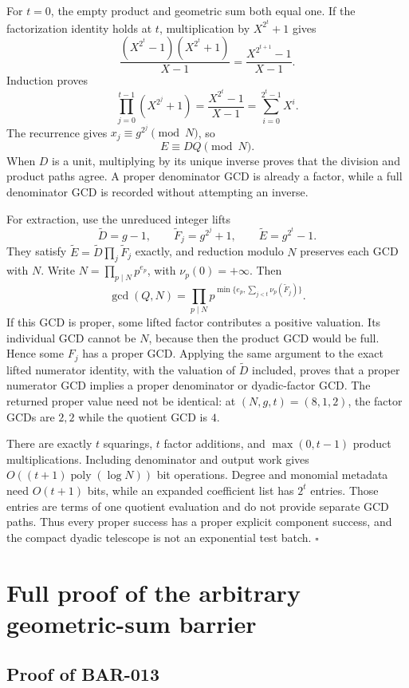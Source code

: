 \documentclass[11pt]{article}
\newcommand{\poly}{\operatorname{poly}}
\begin{document}
For \(t=0\), the empty product and geometric sum both equal one. If the
factorization identity holds at \(t\), multiplication by
\(X^{2^t}+1\) gives
\[
\frac{(X^{2^t}-1)(X^{2^t}+1)}{X-1}
=\frac{X^{2^{t+1}}-1}{X-1}.
\]
Induction proves
\[
\prod_{j=0}^{t-1}(X^{2^j}+1)
=\frac{X^{2^t}-1}{X-1}
=\sum_{i=0}^{2^t-1}X^i.
\]
The recurrence gives \(x_j\equiv g^{2^j}\pmod N\), so
\[
E\equiv DQ\pmod N.
\]
When \(D\) is a unit, multiplying by its unique inverse proves that the
division and product paths agree. A proper denominator GCD is already a
factor, while a full denominator GCD is recorded without attempting an
inverse.

For extraction, use the unreduced integer lifts
\[
\widetilde D=g-1,\qquad
\widetilde F_j=g^{2^j}+1,\qquad
\widetilde E=g^{2^t}-1.
\]
They satisfy
\(\widetilde E=\widetilde D\prod_j\widetilde F_j\) exactly, and reduction
modulo \(N\) preserves each GCD with \(N\). Write
\(N=\prod_{p\mid N}p^{e_p}\), with \(\nu_p(0)=+\infty\). Then
\[
\gcd(Q,N)=
\prod_{p\mid N}
p^{\min\{e_p,\sum_{j<t}\nu_p(\widetilde F_j)\}}.
\]
If this GCD is proper, some lifted factor contributes a positive valuation.
Its individual GCD cannot be \(N\), because then the product GCD would be
full. Hence some \(F_j\) has a proper GCD. Applying the same argument to the
exact lifted numerator identity, with the valuation of \(\widetilde D\)
included, proves that a proper numerator GCD implies a proper denominator or
dyadic-factor GCD. The returned proper value need not be identical: at
\((N,g,t)=(8,1,2)\), the factor GCDs are \(2,2\) while the quotient GCD is
\(4\).

There are exactly \(t\) squarings, \(t\) factor additions, and
\(\max(0,t-1)\) product multiplications. Including denominator and output
work gives \(O((t+1)\poly(\log N))\) bit operations. Degree and monomial
metadata need \(O(t+1)\) bits, while an expanded coefficient list has
\(2^t\) entries. Those entries are terms of one quotient evaluation and do
not provide separate GCD paths. Thus every proper success has a proper
explicit component success, and the compact dyadic telescope is not an
exponential test batch. \(\square\)

\section{Full proof of the arbitrary geometric-sum barrier}

\subsection{Proof of BAR-013}\label{proof:BAR-013}
\end{document}
